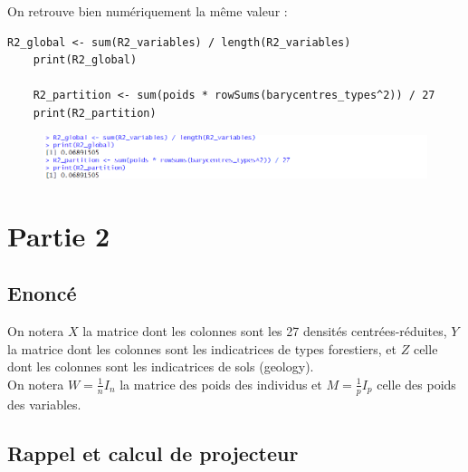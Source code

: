 \documentclass{article}
\begin{document}
On retrouve bien numériquement la même valeur :
\\
\begin{lstlisting}[caption=Extrait du code R, label= Question 1b]
    R2_global <- sum(R2_variables) / length(R2_variables)
    print(R2_global)
    
    R2_partition <- sum(poids * rowSums(barycentres_types^2)) / 27
    print(R2_partition)
\end{lstlisting}

\begin{figure}[H]
    \centering
    \includegraphics[width=1.5\textwidth]{preuve_info_p1.png}
\end{figure}


\newpage
\section{Partie 2}
\subsection{Enoncé}
On notera $X$ la matrice dont les colonnes sont les 27 densités centrées-réduites, $Y$ la
matrice dont les colonnes sont les indicatrices de types forestiers, et $Z$ celle dont les
colonnes sont les indicatrices de sols (geology). \\
On notera $W=\frac{1}{n}I_n$ la matrice des poids des individus et $M=\frac{1}{p}I_p$
celle des poids des variables.
\subsection{Rappel et calcul de projecteur}
\end{document}
